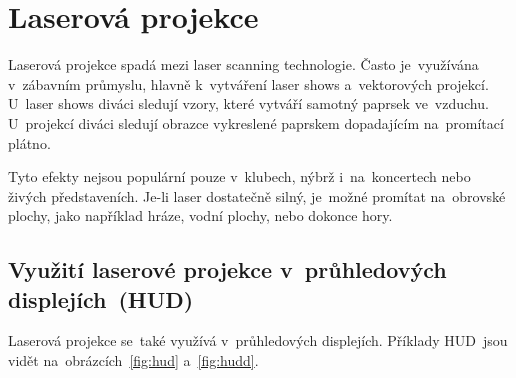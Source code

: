 \chapter{Laserová projekce}
Laserová projekce spadá mezi laser scanning technologie. Často je~využívána v~zábavním průmyslu, hlavně k~vytváření laser shows a~vektorových projekcí. U~laser shows diváci sledují vzory, které vytváří samotný paprsek ve~vzduchu. U~projekcí diváci sledují obrazce vykreslené paprskem dopadajícím na~promítací plátno.~\cite{laser-projection}

Tyto efekty nejsou populární pouze v~klubech, nýbrž i~na~koncertech nebo živých představeních. Je-li laser dostatečně silný, je~možné promítat na~obrovské plochy, jako například hráze, vodní plochy, nebo dokonce hory.~\cite{laser-projection}

\section{Využití laserové projekce v~průhledových displejích~(HUD)}
Laserová projekce se~také využívá v~průhledových displejích. Příklady HUD~jsou vidět na~obrázcích~\ref{fig:hud} a~\ref{fig:hudd}.


